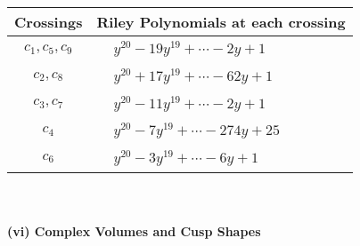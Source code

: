 \documentclass[1p]{elsarticle_modified}
\theoremstyle{definition}
\begin{document}
\begin{tabular}{m{50pt}|m{274pt}}
Crossings & \hspace{64pt}Riley Polynomials at each crossing \\
\hline $$\begin{aligned}c_{1},c_{5},c_{9}\end{aligned}$$&$\begin{aligned}
&y^{20}-19 y^{19}+\cdots-2 y+1
\end{aligned}$\\
\hline $$\begin{aligned}c_{2},c_{8}\end{aligned}$$&$\begin{aligned}
&y^{20}+17 y^{19}+\cdots-62 y+1
\end{aligned}$\\
\hline $$\begin{aligned}c_{3},c_{7}\end{aligned}$$&$\begin{aligned}
&y^{20}-11 y^{19}+\cdots-2 y+1
\end{aligned}$\\
\hline $$\begin{aligned}c_{4}\end{aligned}$$&$\begin{aligned}
&y^{20}-7 y^{19}+\cdots-274 y+25
\end{aligned}$\\
\hline $$\begin{aligned}c_{6}\end{aligned}$$&$\begin{aligned}
&y^{20}-3 y^{19}+\cdots-6 y+1
\end{aligned}$\\
\hline
\end{tabular}\\~\\
\newpage\flushleft \textbf{(vi) Complex Volumes and Cusp Shapes}
\end{document}
